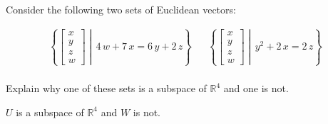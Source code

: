 
\begin{exerciseStatement}


Consider the following two sets of Euclidean vectors: 


\begin{align*}  \left\{ \left[\begin{array}{c}
x \\
y \\
z \\
w
\end{array}\right] \middle|\,4 \, w + 7 \, x = 6 \, y + 2 \, z\right\}  & &   \left\{ \left[\begin{array}{c}
x \\
y \\
z \\
w
\end{array}\right] \middle|\,y^{2} + 2 \, x = 2 \, z\right\}  \\ \end{align*}
            

 Explain why one of these sets is a subspace of \(\mathbb{R}^ 4 \) and one is not. 


\end{exerciseStatement}
    
\begin{exerciseAnswer} 


\(U\) is a subspace of \(\mathbb{R}^ 4 \) and \(W\) is not.


\end{exerciseAnswer}
    

